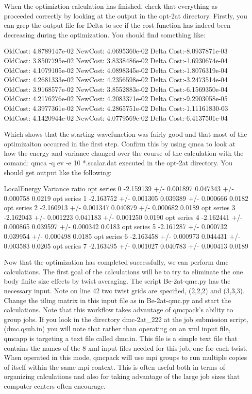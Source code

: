 When the optimiztion calculation has finished, check that everything as proceeded correctly by looking at the output in the opt-2at directory.  Firstly, you can grep the output file for Delta to see if the cost function has indeed been decreasing during the optimization.  You should find something like:
\begin{shade}
 OldCost: 4.8789147e-02 NewCost: 4.0695360e-02 Delta Cost:-8.0937871e-03
 OldCost: 3.8507795e-02 NewCost: 3.8338486e-02 Delta Cost:-1.6930674e-04
 OldCost: 4.1079105e-02 NewCost: 4.0898345e-02 Delta Cost:-1.8076319e-04
 OldCost: 4.2681333e-02 NewCost: 4.2356598e-02 Delta Cost:-3.2473514e-04
 OldCost: 3.9168577e-02 NewCost: 3.8552883e-02 Delta Cost:-6.1569350e-04
 OldCost: 4.2176276e-02 NewCost: 4.2083371e-02 Delta Cost:-9.2903058e-05
 OldCost: 4.3977361e-02 NewCost: 4.2865751e-02 Delta Cost:-1.11161830-03
 OldCost: 4.1420944e-02 NewCost: 4.0779569e-02 Delta Cost:-6.4137501e-04
\end{shade}
Which shows that the starting wavefunction was fairly good and that most of the optimizaiton occurred in the first step.  Confirm this by using qmca to look at how the energy and variance changed over the course of the calculation with the comand: qmca -q ev -e 10 *.scalar.dat executed in the opt-2at directory.  You should get output like the following:
\begin{shade}
                 LocalEnergy               Variance             ratio
opt  series 0  -2.159139 +/- 0.001897   0.047343 +/- 0.000758   0.0219 
opt  series 1  -2.163752 +/- 0.001305   0.039389 +/- 0.000666   0.0182 
opt  series 2  -2.160913 +/- 0.001347   0.040879 +/- 0.000682   0.0189 
opt  series 3  -2.162043 +/- 0.001223   0.041183 +/- 0.001250   0.0190 
opt  series 4  -2.162441 +/- 0.000865   0.039597 +/- 0.000342   0.0183 
opt  series 5  -2.161287 +/- 0.000732   0.039954 +/- 0.000498   0.0185 
opt  series 6  -2.163458 +/- 0.000973   0.044431 +/- 0.003583   0.0205 
opt  series 7  -2.163495 +/- 0.001027   0.040783 +/- 0.000413   0.0189 
\end{shade}

Now that the optimization has completed successfully, we can perform dmc calculations.  The first goal of the calculations will be to try to eliminate the one body finite size effects by twist averaging.  The script Be-2at-qmc.py has the necessary input.  Note on line 42 two twist grids are specified, (2,2,2) and (3,3,3).  Change the tiling matrix in this input file as in Be-2at-qmc.py and start the calculations.  Note that this workflow takes advantage of qmcpack's ability to group jobs.  If you look in the directory dmc-2at\_222 at the job submission script, (dmc.qsub.in) you will note that rather than operating on an xml input file, qmcapp is targeting a text file called dmc.in.  This file is a simple text file that contains the names of the 8 xml input files needed for this job, one for each twist.  When operated in this mode, qmcpack will use mpi groups to run multiple copies of itself within the same mpi context.  This is often useful both in terms of organizing calculations and also for taking advantage of the large job sizes that computer centers often encourage.

